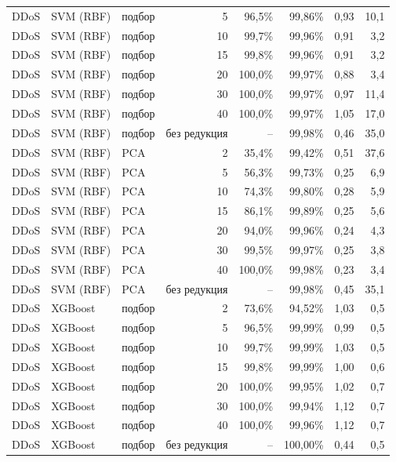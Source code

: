 {\begin{tabular}{@{}lllrrrrr@{}}
\rowcolor{rowalt}DDoS & SVM (RBF) & подбор & 5 & 96,5\% & 99,86\% & 0,93 & 10,1\\
DDoS & SVM (RBF) & подбор & 10 & 99,7\% & 99,96\% & 0,91 & 3,2\\
\rowcolor{rowalt}DDoS & SVM (RBF) & подбор & 15 & 99,8\% & 99,96\% & 0,91 & 3,2\\
DDoS & SVM (RBF) & подбор & 20 & 100,0\% & 99,97\% & 0,88 & 3,4\\
\rowcolor{rowalt}DDoS & SVM (RBF) & подбор & 30 & 100,0\% & 99,97\% & 0,97 & 11,4\\
DDoS & SVM (RBF) & подбор & 40 & 100,0\% & 99,97\% & 1,05 & 17,0\\
\rowcolor{rowalt}DDoS & SVM (RBF) & подбор & без редукция & -- & 99,98\% & 0,46 & 35,0\\
DDoS & SVM (RBF) & PCA & 2 & 35,4\% & 99,42\% & 0,51 & 37,6\\
\rowcolor{rowalt}DDoS & SVM (RBF) & PCA & 5 & 56,3\% & 99,73\% & 0,25 & 6,9\\
DDoS & SVM (RBF) & PCA & 10 & 74,3\% & 99,80\% & 0,28 & 5,9\\
\rowcolor{rowalt}DDoS & SVM (RBF) & PCA & 15 & 86,1\% & 99,89\% & 0,25 & 5,6\\
DDoS & SVM (RBF) & PCA & 20 & 94,0\% & 99,96\% & 0,24 & 4,3\\
\rowcolor{rowalt}DDoS & SVM (RBF) & PCA & 30 & 99,5\% & 99,97\% & 0,25 & 3,8\\
DDoS & SVM (RBF) & PCA & 40 & 100,0\% & 99,98\% & 0,23 & 3,4\\
\rowcolor{rowalt}DDoS & SVM (RBF) & PCA & без редукция & -- & 99,98\% & 0,45 & 35,1\\
DDoS & XGBoost & подбор & 2 & 73,6\% & 94,52\% & 1,03 & 0,5\\
\rowcolor{rowalt}DDoS & XGBoost & подбор & 5 & 96,5\% & 99,99\% & 0,99 & 0,5\\
DDoS & XGBoost & подбор & 10 & 99,7\% & 99,99\% & 1,03 & 0,5\\
\rowcolor{rowalt}DDoS & XGBoost & подбор & 15 & 99,8\% & 99,99\% & 1,00 & 0,6\\
DDoS & XGBoost & подбор & 20 & 100,0\% & 99,95\% & 1,02 & 0,7\\
\rowcolor{rowalt}DDoS & XGBoost & подбор & 30 & 100,0\% & 99,94\% & 1,12 & 0,7\\
DDoS & XGBoost & подбор & 40 & 100,0\% & 99,96\% & 1,12 & 0,7\\
\rowcolor{rowalt}DDoS & XGBoost & подбор & без редукция & -- & 100,00\% & 0,44 & 0,5\\

\end{tabular}}
